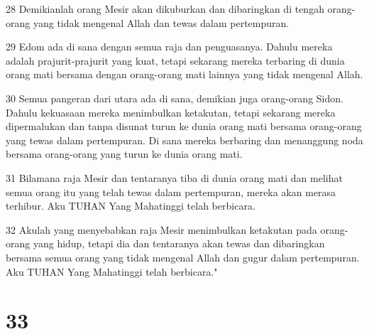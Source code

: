 \par 28 Demikianlah orang Mesir akan dikuburkan dan dibaringkan di tengah orang-orang yang tidak mengenal Allah dan tewas dalam pertempuran.
\par 29 Edom ada di sana dengan semua raja dan penguasanya. Dahulu mereka adalah prajurit-prajurit yang kuat, tetapi sekarang mereka terbaring di dunia orang mati bersama dengan orang-orang mati lainnya yang tidak mengenal Allah.
\par 30 Semua pangeran dari utara ada di sana, demikian juga orang-orang Sidon. Dahulu kekuasaan mereka menimbulkan ketakutan, tetapi sekarang mereka dipermalukan dan tanpa disunat turun ke dunia orang mati bersama orang-orang yang tewas dalam pertempuran. Di sana mereka berbaring dan menanggung noda bersama orang-orang yang turun ke dunia orang mati.
\par 31 Bilamana raja Mesir dan tentaranya tiba di dunia orang mati dan melihat semua orang itu yang telah tewas dalam pertempuran, mereka akan merasa terhibur. Aku TUHAN Yang Mahatinggi telah berbicara.
\par 32 Akulah yang menyebabkan raja Mesir menimbulkan ketakutan pada orang-orang yang hidup, tetapi dia dan tentaranya akan tewas dan dibaringkan bersama semua orang yang tidak mengenal Allah dan gugur dalam pertempuran. Aku TUHAN Yang Mahatinggi telah berbicara."

\chapter{33}

